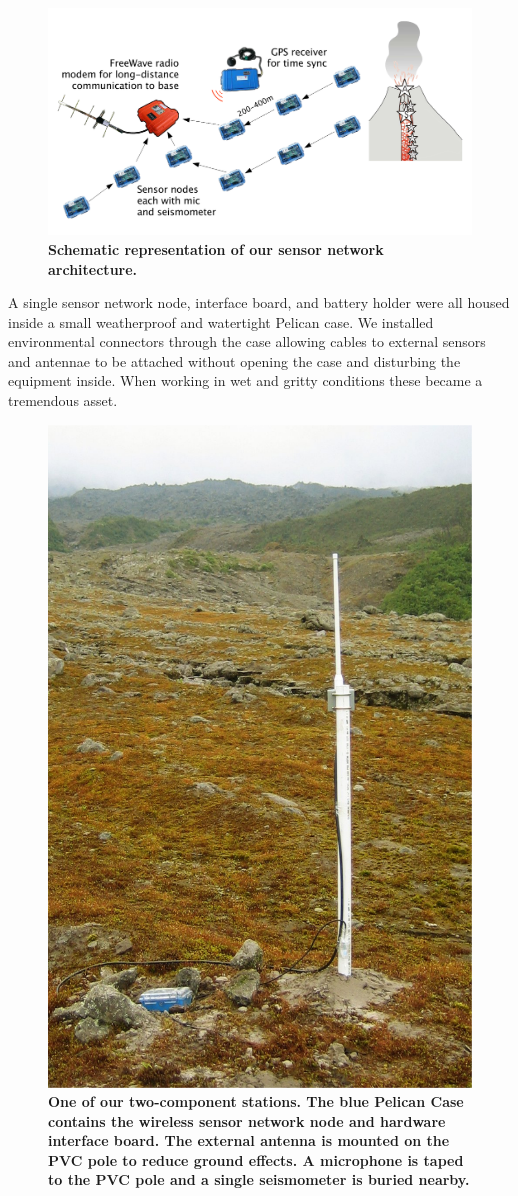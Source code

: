 \begin{figure}[t]
\label{casestudy-fig-picture}
\begin{center}
\includegraphics[width=0.7\hsize]{./4-casestudy/figs/schematic}
\end{center}
\caption{\textbf{Schematic representation of our sensor network
architecture.}}
\end{figure}

A single sensor network node, interface board, and battery holder were all
housed inside a small weatherproof and watertight Pelican case.  We installed
environmental connectors through the case allowing cables to external sensors
and antennae to be attached without opening the case and disturbing the
equipment inside.  When working in wet and gritty conditions these became a
tremendous asset.

\begin{figure}[t]
\begin{center}
\includegraphics[width=0.7\hsize]{./4-casestudy/figs/Station}
\end{center}
\caption{\textbf{One of our two-component stations.  The blue Pelican
Case contains the wireless sensor network node and hardware interface board.
The external antenna is mounted on the PVC pole to reduce ground effects.
A microphone is taped to the PVC pole and a single seismometer is buried
nearby.}}
\label{fig-station}
\end{figure}

